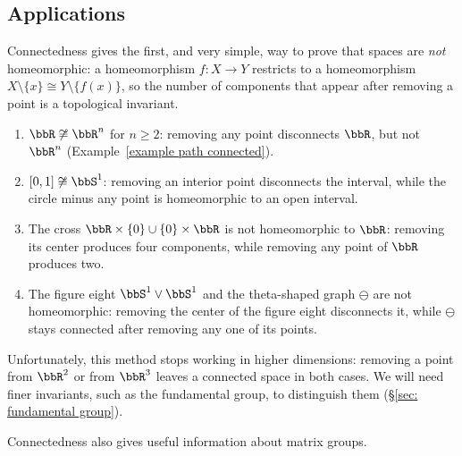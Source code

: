 \subsection{Applications}

Connectedness gives the first, and very simple, way to prove that spaces are \emph{not} homeomorphic: a homeomorphism $f:X\to Y$ restricts to a homeomorphism $X\setminus\{x\}\cong Y\setminus\{f(x)\}$, so the number of components that appear after removing a point is a topological invariant.

\begin{example}\label{example cut points}
    \begin{enumerate}
        \item $\bbR\not\cong\bbR^n$ for $n\geq2$: removing any point disconnects $\bbR$, but not $\bbR^n$ (Example~\ref{example path connected}).
        \item $[0,1]\not\cong\bbS^1$: removing an interior point disconnects the interval, while the circle minus any point is homeomorphic to an open interval.
        \item The cross $\bbR\times\{0\}\cup\{0\}\times\bbR$ is not homeomorphic to $\bbR$: removing its center produces four components, while removing any point of $\bbR$ produces two.
        \item The figure eight $\bbS^1\vee\bbS^1$ and the theta-shaped graph $\ominus$ are not homeomorphic: removing the center of the figure eight disconnects it, while $\ominus$ stays connected after removing any one of its points.
    \end{enumerate}
\end{example}

Unfortunately, this method stops working in higher dimensions: removing a point from $\bbR^2$ or from $\bbR^3$ leaves a connected space in both cases. We will need finer invariants, such as the fundamental group, to distinguish them (\S\ref{sec: fundamental group}).

Connectedness also gives useful information about matrix groups.

